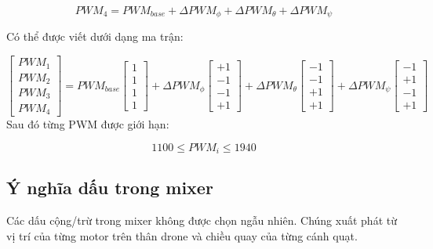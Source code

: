 \begin{equation}
    PWM_4
    =
    PWM_{base}
    +
    \Delta PWM_\phi
    +
    \Delta PWM_\theta
    +
    \Delta PWM_\psi
\end{equation}

Có thể được viết dưới dạng ma trận:

\begin{equation}
    \begin{bmatrix}
        PWM_1 \\
        PWM_2 \\
        PWM_3 \\
        PWM_4
    \end{bmatrix}
    = PWM_{base}
    \begin{bmatrix}
        1 \\
        1 \\
        1 \\
        1
    \end{bmatrix}
    + \Delta PWM_{\phi}
    \begin{bmatrix}
        +1 \\
        -1 \\
        -1 \\
        +1
    \end{bmatrix}
    + \Delta PWM_{\theta}
    \begin{bmatrix}
        -1 \\
        -1 \\
        +1 \\
        +1
    \end{bmatrix}
    + \Delta PWM_{\psi}
    \begin{bmatrix}
        -1 \\
        +1 \\
        -1 \\
        +1
    \end{bmatrix}
\end{equation}
Sau đó từng PWM được giới hạn:

\begin{equation}
    1100 \leq PWM_i \leq 1940
\end{equation}

\subsection{Ý nghĩa dấu trong mixer}

Các dấu cộng/trừ trong mixer không được chọn ngẫu nhiên. Chúng xuất phát từ
vị trí của từng motor trên thân drone và chiều quay của từng cánh quạt.

